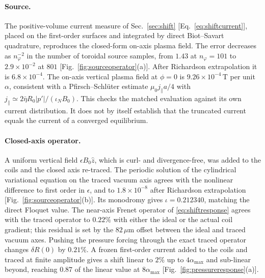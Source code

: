 \paragraph*{Source.}
The positive-volume current measure of Sec.~\ref{sec:shift} [Eq.~\eqref{eq:shiftcurrent}], placed on the first-order surfaces and integrated by direct Biot--Savart quadrature, reproduces the closed-form on-axis plasma field. The error decreases as $n_\varphi^{-2}$ in the number of toroidal source samples, from $1.43$ at $n_\varphi=101$ to $2.9\times10^{-2}$ at $801$ [Fig.~\ref{fig:sourceoperator}(a)]. After Richardson extrapolation it is $6.8\times10^{-4}$. The on-axis vertical plasma field at $\phi=0$ is $9.26\times10^{-4}\,\mathrm{T}$ per unit $\alpha$, consistent with a Pfirsch--Schl\"uter estimate $\mu_0 j_\parallel a/4$ with $j_\parallel\simeq2\bar\eta R_0|p'|/(\iota_NB_0)$. This checks the matched evaluation against its own current distribution. It does not by itself establish that the truncated current equals the current of a converged equilibrium.

\paragraph*{Closed-axis operator.}
A uniform vertical field $\epsilon B_0\hat z$, which is curl- and divergence-free, was added to the coils and the closed axis re-traced. The periodic solution of the cylindrical variational equation on the traced vacuum axis agrees with the nonlinear difference to first order in $\epsilon$, and to $1.8\times10^{-8}$ after Richardson extrapolation [Fig.~\ref{fig:sourceoperator}(b)]. Its monodromy gives $\iota=0.212340$, matching the direct Floquet value. The near-axis Frenet operator of \eqref{eq:shiftresponse} agrees with the traced operator to $0.22\%$ with either the ideal or the actual coil gradient; this residual is set by the $82\,\mu\mathrm m$ offset between the ideal and traced vacuum axes. Pushing the pressure forcing through the exact traced operator changes $\delta R(0)$ by $0.21\%$. A frozen first-order current added to the coils and traced at finite amplitude gives a shift linear to $2\%$ up to $4\alpha_{\max}$ and sub-linear beyond, reaching $0.87$ of the linear value at $8\alpha_{\max}$ [Fig.~\ref{fig:pressureresponse}(a)].

